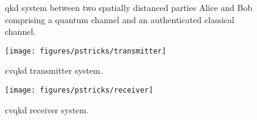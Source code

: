 \begin{figure}[htb]
	\centering
	
	\caption{\Gls{qkd} system between two spatially distanced parties Alice and Bob comprising a quantum channel and an authenticated classical channel.}
\end{figure}

\begin{figure}[htb]
	\centering
	\texttt{[image: figures/pstricks/transmitter]}
	\caption{\Gls{cvqkd} transmitter system.}
\end{figure}
\begin{figure}[htb]
	\centering
	\texttt{[image: figures/pstricks/receiver]}
	\caption{\Gls{cvqkd} receiver system.}
\end{figure}
